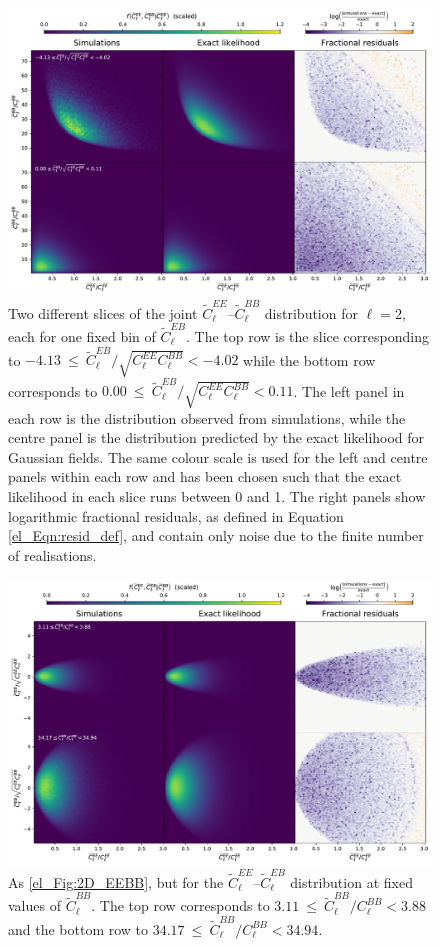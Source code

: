 \begin{figure}
    \includegraphics[width=\columnwidth]{2D_EEBB}
    \caption{Two different slices of the joint $\widetilde{C}_\ell^{EE}$--$\widetilde{C}_\ell^{BB}$ distribution for $\ell = 2$, each for one fixed bin of $\widetilde{C}_\ell^{EB}$. The top row is the slice corresponding to $-4.13~\leq~\widetilde{C}_\ell^{EB} / \sqrt{ C_\ell^{EE} C_\ell^{BB} } < -4.02$ while the bottom row corresponds to $0.00~\leq~\widetilde{C}_\ell^{EB} / \sqrt{ C_\ell^{EE} C_\ell^{BB} } < 0.11$. The left panel in each row is the distribution observed from simulations, while the centre panel is the distribution predicted by the exact likelihood for Gaussian fields. The same colour scale is used for the left and centre panels within each row and has been chosen such that the exact likelihood in each slice runs between 0 and 1. The right panels show logarithmic fractional residuals, as defined in Equation \eqref{el_Eqn:resid_def}, and contain only noise due to the finite number of realisations.}
    \label{el_Fig:2D_EEBB}
\end{figure}
\begin{figure}
    \includegraphics[width=\columnwidth]{2D_EEEB}
    \caption{As \autoref{el_Fig:2D_EEBB}, but for the $\widetilde{C}_\ell^{EE}$--$\widetilde{C}_\ell^{EB}$ distribution at fixed values of $\widetilde{C}_\ell^{BB}$. The top row corresponds to $3.11~\leq~\widetilde{C}_\ell^{BB} / C_\ell^{BB} < 3.88$ and the bottom row to $34.17~\leq~\widetilde{C}_\ell^{BB} / C_\ell^{BB} < 34.94$.}
\end{figure}
